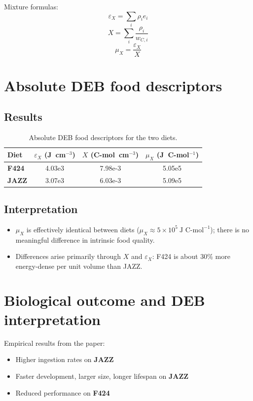 \documentclass[11pt]{article}
\begin{document}
Mixture formulas:
\[
  \varepsilon_X = \sum_i \rho_i e_i
\]
\[
  X = \sum_i \frac{\rho_i}{w_{C,i}}
\]
\[
  \mu_X = \frac{\varepsilon_X}{X}
\]

\section{Absolute DEB food descriptors}

\subsection{Results}

\begin{table}[h]
  \centering
  \begin{tabular}{lS[table-format=1.2e1]S[table-format=1.2e-2]S[table-format=1.2e5]}
    \toprule
    Diet & {$\varepsilon_X$ (J~cm$^{-3}$)} & {$X$ (C-mol~cm$^{-3}$)} & {$\mu_X$ (J~C-mol$^{-1}$)} \\
    \midrule
    \textbf{F424} & 4.03e3 & 7.98e-3 & 5.05e5 \\
    \textbf{JAZZ} & 3.07e3 & 6.03e-3 & 5.09e5 \\
    \bottomrule
  \end{tabular}
  \caption{Absolute DEB food descriptors for the two diets.}
\end{table}

\subsection{Interpretation}

\begin{itemize}
  \item $\mu_X$ is effectively identical between diets ($\mu_X \approx 5 \times 10^5\ \text{J C-mol}^{-1}$); there is no meaningful difference in intrinsic food quality.
  \item Differences arise primarily through $X$ and $\varepsilon_X$: F424 is about 30\% more energy-dense per unit volume than JAZZ.
\end{itemize}

\section{Biological outcome and DEB interpretation}

Empirical results from the paper:
\begin{itemize}
  \item Higher ingestion rates on \textbf{JAZZ}
  \item Faster development, larger size, longer lifespan on \textbf{JAZZ}
  \item Reduced performance on \textbf{F424}
\end{itemize}
\end{document}
